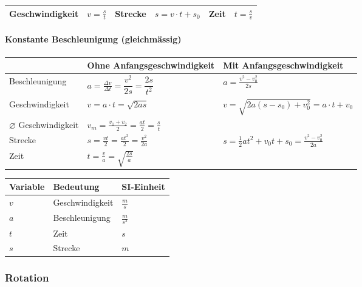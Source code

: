 \documentclass[
a4paper,
oneside,
landscape, 
8pt,
]{scrartcl}
\begin{document}
\begin{multicols*}{2}
\begin{tabbing}
	\begin{tabu} to \linewidth {l X l X l X}
		\toprule
		Geschwindigkeit & $v = \frac{s}{t}$ &
		Strecke & $s = v \cdot t + s_0$ &
		Zeit & $t = \frac{s}{v}$ \\
		\bottomrule
	\end{tabu}
\end{tabbing}

\paragraph{Konstante Beschleunigung (gleichmässig)}

\begin{tabbing}
	\begin{tabu} to \linewidth {l X X}
		\toprule
		& Ohne Anfangsgeschwindigkeit & Mit Anfangsgeschwindigkeit \\
		\midrule
		Beschleunigung & 
		$a = \frac{\Delta v}{ \Delta t} = \dfrac{v^2}{2s} = \dfrac{2s}{t^2}$ &
		$a = \frac{v^2 - v_0^2}{2s}$ \\
		Geschwindigkeit & 
		$v = a \cdot t = \sqrt{2 a s}$ &
		$v = \sqrt{2a(s-s_0) + v_0^2} = a \cdot t + v_0 $ \\
		$\varnothing$ Geschwindigkeit & 
		$v_m = \frac{v_1 + v_2}{2} = \frac{at}{2} = \frac{s}{t}$ &
		 \\
		Strecke & 
		$s = \frac{v t}{2} = \frac{a t^2}{2} = \frac{v^2}{2a}$ &
		$s = \frac{1}{2} at^2 + v_0 t + s_0 = \frac{v^2 - v_0^2}{2a} $ \\
		Zeit & 
		$t = \frac{v}{a} = \sqrt{\frac{2s}{a}}$ & \\		
	\end{tabu}
\end{tabbing}

\begin{tabbing}
	\begin{tabu} to \linewidth {l X l}
		Variable & Bedeutung & SI-Einheit \\
		\midrule
		$v$ & Geschwindigkeit  & $\frac{m}{s}$ \\ 
		$a$ & Beschleunigung  & $\frac{m}{s^2}$ \\ 
		$t$ & Zeit  & $s$ \\ 
		$s$ & Strecke  & $m$ \\ 
		\bottomrule
	\end{tabu}
\end{tabbing}

\subsubsection{Rotation}


\end{multicols*}
\end{document}

